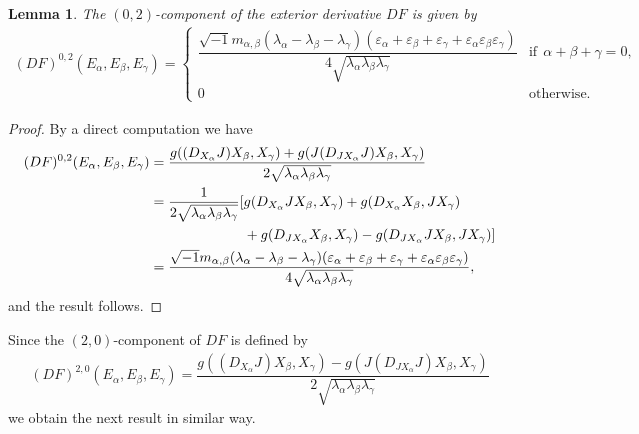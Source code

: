 \documentclass[10pt,a4paper]{amsart}
\numberwithin{equation}{section}
\newtheorem{Lemma}[Theorem]{Lemma}
\begin{document}
\begin{Lemma}
The $(0,2)$-component of the exterior derivative $DF$ is given by
\begin{gather*}
(DF)^{0,2}(E_{\alpha},E_{\beta},E_{\gamma})=
\begin{cases}
\dfrac{\sqrt{-1} m_{\alpha,\beta}(\lambda_{\alpha}\!-\!\lambda_{\beta}\!-\!\lambda_{\gamma})(\varepsilon_{\alpha} \!+\!\varepsilon_{\beta}\!+\!\varepsilon_{\gamma}\!+\!\varepsilon_{\alpha}\varepsilon_{\beta}\varepsilon_{\gamma})} {4\sqrt{\lambda_{\alpha}\lambda_{\beta}\lambda_{\gamma}}} &\text{if}\ \ \alpha\!+\!\beta\!+\!\gamma = 0,
\\
0 &\text{otherwise.}
\end{cases}
\end{gather*}
\end{Lemma}
\begin{proof}
By a direct computation we have
\begin{align*}
(DF)^{0,2}(E_{\alpha},E_{\beta},E_{\gamma})={}&\dfrac{g((D_{X_{\alpha}}J)X_{\beta},X_{\gamma}) +g(J(D_{JX_{\alpha}}J)X_{\beta},X_{\gamma})}{2\sqrt{\lambda_{\alpha}\lambda_{\beta}\lambda_{\gamma}}}
\\
={}&\dfrac{1}{2\sqrt{\lambda_{\alpha}\lambda_{\beta}\lambda_{\gamma}}} [g(D_{X_{\alpha}}JX_{\beta},X_{\gamma})+g(D_{X_{\alpha}}X_{\beta},J X_{\gamma})
\\
&\hphantom{\dfrac{1}{2\sqrt{\lambda_{\alpha}\lambda_{\beta}\lambda_{\gamma}}} [}+g(D_{J X_{\alpha}}X_{\beta},X_{\gamma})-g(D_{J X_{\alpha}}J{X_{\beta}},J X_{\gamma})]
\\
={}&\dfrac{\sqrt{-1}m_{\alpha,\beta}(\lambda_{\alpha}-\lambda_{\beta} -\lambda_{\gamma})(\varepsilon_{\alpha} +\varepsilon_{\beta}+\varepsilon_{\gamma} +\varepsilon_{\alpha}\varepsilon_{\beta}\varepsilon_{\gamma})} {4\sqrt{\lambda_{\alpha}\lambda_{\beta}\lambda_{\gamma}}},
\end{align*}
and the result follows.
\end{proof}

Since the $(2,0)$-component of $DF$ is defined by
\begin{gather*}
(DF)^{2,0}(E_{\alpha},E_{\beta},E_{\gamma})=\dfrac{g((D_{X_{\alpha}}J)X_{\beta},X_{\gamma})-g(J(D_{JX_{\alpha}}J)X_{\beta},X_{\gamma})}{2\sqrt{\lambda_{\alpha}\lambda_{\beta}\lambda_{\gamma}}}
\end{gather*}
we obtain the next result in similar way.
\end{document}
